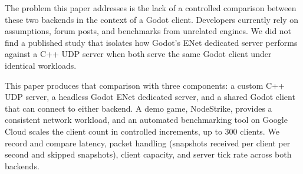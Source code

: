 \IfFileExists{IEEEtran.cls}{\ieeetrue\documentclass[conference]{IEEEtran}}{\ieeefalse\documentclass[twocolumn,10pt]{article}}
\begin{document}
The problem this paper addresses is the lack of a controlled comparison between these two backends in the context of a Godot client. Developers currently rely on assumptions, forum posts, and benchmarks from unrelated engines. We did not find a published study that isolates how Godot's ENet dedicated server performs against a C++ UDP server when both serve the same Godot client under identical workloads.

This paper produces that comparison with three components: a custom C++ UDP server, a headless Godot ENet dedicated server, and a shared Godot client that can connect to either backend. A demo game, NodeStrike, provides a consistent network workload, and an automated benchmarking tool on Google Cloud scales the client count in controlled increments, up to 300 clients. We record and compare latency, packet handling (snapshots received per client per second and skipped snapshots), client capacity, and server tick rate across both backends.
\end{document}
